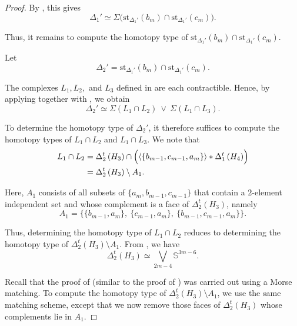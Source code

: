 \documentclass[11pt,reqno,a4paper]{amsart}
\theoremstyle{definition}
\theoremstyle{theorem}
\newcommand{\lno}{\left(}
\newcommand{\rno}{\right)}
\newcommand{\bbS}{\mathbb{S}}
\newcommand{\st}{\mathrm{st}}
\theoremstyle{remark}
\begin{document}
\begin{proof}
By , this gives
\[
    \Delta_1' 
        \simeq 
        \Sigma \bigl( 
            \st_{\Delta_1'}\lno b_m \rno 
            \cap 
            \st_{\Delta_1'}\lno c_m \rno 
        \bigr).
\]

Thus, it remains to compute the homotopy type of  
\(
    \st_{\Delta_1'}\lno b_m \rno 
    \cap 
    \st_{\Delta_1'}\lno c_m \rno.
\)

Let 
\[
    \Delta_2' 
        = \st_{\Delta_1'}\lno b_m \rno 
          \cap 
          \st_{\Delta_1'}\lno c_m \rno.
\]

The complexes $L_1, L_2,$ and \(L_3\) defined in 
are each contractible.  
Hence, by applying 
 together with 
, we obtain
\[
    \Delta_2' 
        \simeq 
        \Sigma(L_1 \cap L_2)\ 
        \vee\ 
        \Sigma(L_1 \cap L_3).
\]

To determine the homotopy type of $\Delta_2'$, it therefore suffices to compute the homotopy types of 
\(L_1 \cap L_2\) and \(L_1 \cap L_3\).  
We note that
\begin{align*}
    L_1 \cap L_2 
        &= 
        \Delta_2^t \lno H_3 \rno 
           \cap 
           \Bigl(
               \left\langle \{b_{m-1}, c_{m-1}, a_m\} \right\rangle 
               * 
               \Delta_1^t \lno H_4 \rno
           \Bigr) \\
        &= 
        \Delta_2^t \lno H_3 \rno \setminus A_1.
\end{align*}

Here, $A_1$ consists of all subsets of 
$\{a_m, b_{m-1}, c_{m-1}\}$ 
that contain a $2$-element independent set and whose complement is a face of 
$\Delta_2^t \lno H_3 \rno$, namely
\[
    A_1 
    = 
    \bigl\{
        \{b_{m-1}, a_m\},\ 
        \{c_{m-1}, a_m\},\ 
        \{b_{m-1}, c_{m-1}, a_m\}
    \bigr\}.
\]

Thus, determining the homotopy type of 
$L_1 \cap L_2$ reduces to determining the homotopy type of 
$\Delta_2^t \lno H_3 \rno \setminus A_1$.  
From , we have
\[
    \Delta_2^t \lno H_3 \rno 
        \simeq 
        \bigvee_{2m-4} \bbS^{3m-6}.
\]

Recall that the proof of 
(similar to the proof of 
) 
was carried out using a Morse matching.  
To compute the homotopy type of 
$\Delta_2^t \lno H_3 \rno \setminus A_1$, 
we use the same matching scheme, except that we now remove those faces of 
$\Delta_2^t \lno H_3 \rno$ whose complements lie in $A_1$.



\end{proof}
\end{document}
